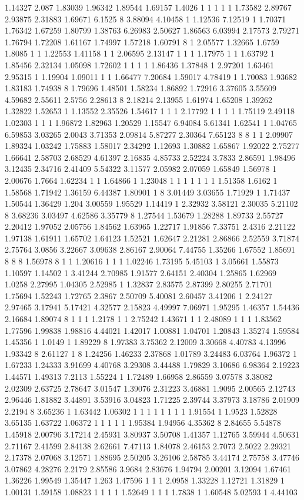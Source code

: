 1.14327 2.087 1.83039 1.96342 1.89544 1.69157 1.4026 1 1 1 1 1 1.73582 2.89767 2.93875 2.31883 1.69671 6.1525 8 3.88094 4.10458 1 1.12536 7.12519 1 1.70371 1.76342 1.67259 1.80799 1.38763 6.26983 2.50627 1.86563 6.03994 2.17573 2.79271 1.76794 1.72208 1.61167 1.74997 1.57218 1.60791 8 1 2.05577 1.32665 1.6759 1.8085 1 1 1.22553 1.41158 1 1 2.06595 2.13147 1 1 1 1.17975 1 1 1.63792 1 1.85456 2.32134 1.05098 1.72602 1 1 1 1 1.86436 1.37848 1 2.97201 1.63461 2.95315 1 1.19904 1.09011 1 1 1.66477 7.20684 1.59017 4.78419 1 1.70083 1.93682 1.83183 1.74938 8 1.79696 1.48501 1.58234 1.86892 1.72916 3.37605 3.55609 4.59682 2.55611 2.5756 2.28613 8 2.18214 2.13955 1.61974 1.65208 1.39262 1.32822 1.52653 1 1.13552 2.35526 1.54617 1 1 1 2.17792 1 1 1 1 1.75119 2.49118 1.02303 1 1 1 1.96872 1.82963 1.20529 1.15547 6.94084 5.61341 1.62541 1 1.04765 6.59853 3.03265 2.0043 3.71353 2.09814 5.87277 2.30364 7.65123 8 8 1 1 2.09907 1.89324 1.03242 1.75883 1.58017 2.34292 1.12693 1.30882 1.65867 1.92022 2.75277 1.66641 2.58703 2.68529 4.61397 2.16835 4.85733 2.52224 3.7833 2.86591 1.98496 3.12435 2.34716 2.41409 5.54322 3.11577 2.05982 2.07059 1.65849 1.56978 1 2.00676 1.7664 1.62234 1 1 1.64866 1 1.23048 1 1 1 1 1 1 1 1.51358 1.6162 1 1.58568 1.71942 1.36159 6.44387 1.80901 1 8 3.01449 3.03655 1.71929 1 1.71437 1.50544 1.36429 1.204 3.00559 1.95529 1.14419 1 2.32932 3.58121 2.30035 5.21102 8 3.68236 3.03497 4.62586 3.35779 8 1.27544 1.53679 1.28288 1.89733 2.55727 2.20412 1.97052 2.05756 1.84562 1.63965 1.22717 1.91856 7.33751 2.4316 2.21122 1.97138 1.61911 1.65702 1.64123 1.52521 1.62647 2.21281 2.86866 2.52559 3.71874 2.75764 3.0856 3.22667 3.09638 2.86167 2.90064 7.44755 1.35266 1.67552 1.85691 8 8 8 1.56978 8 1 1 1.20616 1 1 1 1.02246 1.73195 5.45103 1 3.05661 1.55873 1.10597 1.14502 1 3.41244 2.70985 1.91577 2.64151 2.40304 1.25865 1.62969 1.0258 2.27995 1.04305 2.52985 1 1.32837 2.83575 2.87399 2.80255 2.71701 1.75694 1.52243 1.72765 2.3867 2.50709 5.40081 2.60457 3.41206 1 2.24127 2.97465 3.17941 5.17421 4.32577 2.15823 4.49997 7.06971 1.95295 1.46357 1.54436 2.16684 1.89074 8 1 1 1 1.2178 1 1 2.75242 1.43671 1 1 2.48089 1 1 1 1.83562 1.77596 1.99838 1.98816 4.44021 1.42017 1.00881 1.04701 1.20843 1.35274 1.59584 1.45356 1 1.0149 1 1.89229 8 1.97383 3.75362 2.12009 3.30668 4.40783 4.13996 1.93342 8 2.61127 1 8 1.24256 1.46233 2.37868 1.01789 3.24483 6.03764 1.96372 1 1.67233 1.24333 3.91699 4.40768 3.29308 3.44488 1.79829 3.10686 6.98364 2.19223 1.44571 1.49313 7.2113 1.55224 1 1.72489 1.66958 2.86559 3.07578 3.38082 2.02309 2.63725 2.78647 3.01547 1.39076 2.31223 3.46881 1.9095 2.00565 2.12743 2.96446 1.81882 3.44891 3.53916 3.04823 1.71225 2.39744 3.37973 3.18786 2.01909 2.2194 8 3.65236 1 1.63442 1.06302 1 1 1 1 1 1 1 1 1.91554 1 1.9523 1.52828 3.65135 1.63722 1.06372 1 1 1 1 1 1.95384 1.94956 4.35362 8 2.84655 5.54878 1.45918 2.00796 3.17214 2.45931 3.80937 3.50708 1.41357 1.12765 3.59944 4.50631 2.71167 2.41599 2.84138 2.62661 7.47113 1.84078 2.46153 2.7073 2.5022 2.29321 2.17378 2.07068 3.12571 1.88695 2.50205 3.26106 2.58785 3.44174 2.75758 3.47746 3.07862 4.28276 2.2179 2.85586 3.9684 2.83676 1.94794 2.00201 3.12094 1.67461 1.36226 1.99549 1.35447 1.263 1.47596 1 1 1 2.0958 1.33228 1.12721 1.31829 1 1.00131 1.59158 1.08823 1 1 1 1 1.52649 1 1 1 1.7838 1 1.60548 5.02593 1 4.44103 